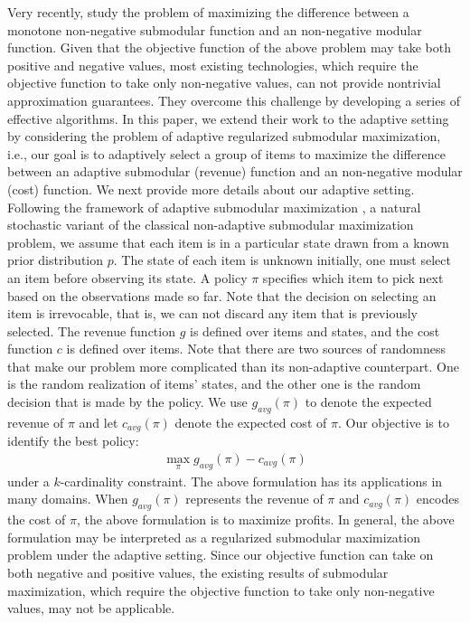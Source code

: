 \documentclass[twoside,leqno,twocolumn]{article}
\begin{document}
Very recently, \cite{harshaw2019submodular} study the problem of maximizing the difference between a monotone non-negative submodular function and an non-negative modular function. Given that the objective function of the above problem may take both positive and negative values, most existing technologies, which  require the objective function to take only non-negative values,  can not  provide nontrivial approximation guarantees. They overcome this challenge by developing a series of effective algorithms. In this paper, we extend their work to the adaptive setting by considering the  problem of  adaptive regularized submodular maximization, i.e., our goal is to adaptively select a group of items to maximize the difference between an adaptive submodular (revenue) function and an non-negative modular (cost) function. We next provide more details about our adaptive setting. Following the framework of adaptive submodular maximization \cite{golovin2011adaptive}, a natural stochastic variant of the classical non-adaptive submodular maximization problem,  we assume that each item is in a particular state drawn from a known prior distribution $p$. The state of each item is unknown initially, one must select an item before observing its state. A policy $\pi$ specifies which item to pick next based on the observations made so far. Note that the decision on selecting an item is irrevocable, that is, we can not discard any item that is previously selected.  The revenue function $g$ is defined over items and states, and the cost function $c$ is defined over items.  Note that there are two sources of randomness that make our problem more complicated than its non-adaptive counterpart. One is the random realization of items' states, and the other one is the random decision that is made by the policy. We use $g_{avg}(\pi)$ to denote the expected revenue of $\pi$ and  let $c_{avg}(\pi)$ denote the expected cost of $\pi$. Our objective is to identify the best policy:
\begin{eqnarray*}
\max_{\pi}g_{avg}(\pi)-c_{avg}(\pi)
\end{eqnarray*} under a $k$-cardinality constraint. The above formulation has its applications in many domains. When $g_{avg}(\pi)$ represents the revenue of $\pi$ and $c_{avg}(\pi)$ encodes the cost of $\pi$, the above formulation is to maximize profits. In general,  the above formulation may be interpreted as a regularized submodular maximization problem under the adaptive setting. Since our objective function can take on both negative and positive values, the existing results of submodular maximization, which require the objective function to take only non-negative values, may not be applicable.
\end{document}
